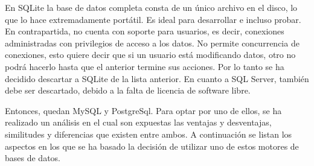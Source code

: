 \documentclass[11pt,oneside]{book}
\begin{document}
En SQLite la base de datos completa consta de un único archivo en el disco, lo que lo hace extremadamente portátil. Es ideal para desarrollar e incluso probar. En contrapartida, no cuenta con soporte para usuarios, es decir, conexiones administradas con privilegios de acceso a los datos. No permite concurrencia de conexiones, esto quiere decir que si un usuario está modificando datos, otro no podrá hacerlo hasta que el anterior termine sus acciones. Por lo tanto se ha decidido descartar a SQLite de la lista anterior. En cuanto a SQL Server, también debe ser descartado, debido a la falta de licencia de software libre.

Entonces, quedan MySQL y PostgreSql. Para optar por uno de ellos, se ha realizado un análisis en el cual son expuestas las ventajas y desventajas, similitudes y diferencias que existen entre ambos. A continuación se listan los aspectos en los que se ha basado la decisión de utilizar uno de estos motores de bases de datos.
\end{document}
